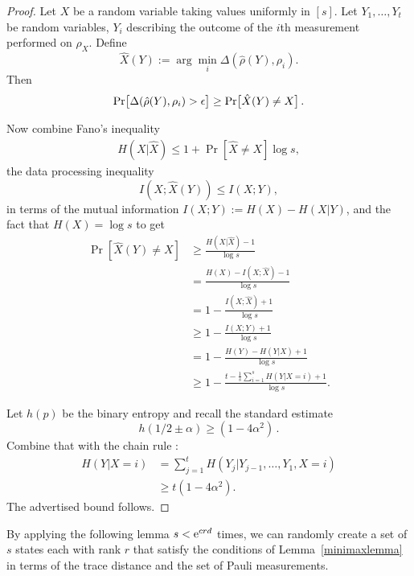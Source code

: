 \begin{proof}
	Let $X$ be a random variable taking values uniformly in
	$[s]$. Let $Y_1, \dots, Y_t$ be random variables, $Y_i$
	describing the outcome of the $i$th measurement performed on
	$\rho_X$. Define 
	\begin{equation*}
		\hat X(Y) := \arg \min_i \Delta(\hat\rho(Y),\rho_i).
	\end{equation*}
	Then 
	\begin{equation}\label{eqn:lb1}
		\Pr\bigl[ \Delta(\hat\rho(Y),\rho_i) > \epsilon \bigr] 
		\geq
		\Pr\bigl[ \hat X(Y) \neq X \bigr] \,.
	\end{equation}

	Now combine Fano's inequality
	\begin{align*}
		H(X|\hat X)\leq	1+
		\Pr[ \hat X \neq X ] \log s,
	\end{align*}
	the data processing inequality 
	\begin{equation*}
		I(X;\hat X(Y))\leq I(X;Y),
	\end{equation*}
	in terms of the mutual information $I(X;Y):=H(X)-H(X|Y)$,
	and the fact that $H(X)=\log s$ to get
	\begin{align*}
		\Pr[ \hat X(Y) \neq X ]
		&\geq
		\frac{H(X|\hat X) - 1}{\log s} \\
		&=
		\frac{H(X)-I(X;\hat X) - 1}{\log s} \\
		&=
		1-\frac{I(X;\hat X) + 1}{\log s} \\
		&\geq
		1-\frac{I(X;Y) + 1}{\log s} \\
		&=
		1-\frac{ 
		H(Y) - H(Y|X) + 1}{\log s} \\
		&\geq
		1-\frac{ 
		t - \frac1s \sum_{i=1}^s H(Y|X=i) + 1}{\log s}.
	\end{align*}

	Let $h(p)$ be the binary entropy and recall the standard estimate
	\begin{equation*}
		 h(1/2\pm\alpha) \geq (1-4\alpha^2)\,.
	\end{equation*}
	Combine that with the chain rule \cite[Theorem~2.5.1]{Cover1991}:
	\begin{align*}
		H(Y|X=i) &=
		\sum_{j=1}^t H(Y_j | Y_{j-1}, \dots, Y_1, X=i) \\
		&\geq
		t (1-4\alpha^2).
	\end{align*}
	The advertised bound follows.
\end{proof}

By applying the following lemma $s < \mathrm{e}^{crd}$ times, we can randomly create a set of $s$ states each with rank $r$ that satisfy the conditions of Lemma~\ref{minimaxlemma} in terms of the trace distance and the set of Pauli measurements. 

